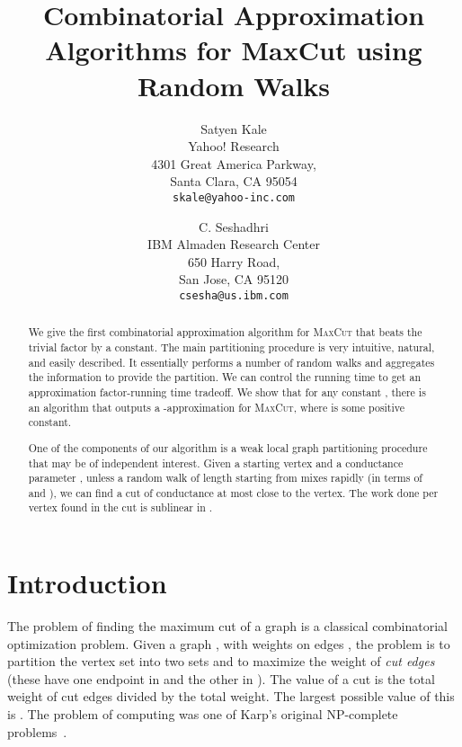 \documentclass[11pt]{article}
\def\maxcut{\textsc{MaxCut}\xspace}
\begin{document}
\begin{titlepage}
\title{Combinatorial Approximation Algorithms for {\sc MaxCut} using Random Walks}
\date{}
\author{
Satyen Kale\\
Yahoo! Research\\
4301 Great America Parkway, \\
Santa Clara, CA 95054\\
{\tt skale@yahoo-inc.com} \and
C. Seshadhri \\
IBM Almaden Research Center\\
650 Harry Road, \\
San Jose, CA 95120\\
{\tt csesha@us.ibm.com}}
\maketitle

\thispagestyle{empty}
\begin{abstract}

We give the first combinatorial approximation algorithm for \maxcut that beats
the trivial  factor by a constant. The main partitioning procedure is very intuitive, natural, and easily described. It essentially performs a number of random walks and aggregates the information to provide the partition. We can control the running time to get an approximation factor-running time tradeoff. We show that for any constant , there is an  algorithm that outputs a -approximation for \maxcut, where  is some positive constant.

One of the components of our algorithm is a weak local
graph partitioning procedure that may be of independent interest. Given a starting vertex  and a conductance parameter , unless a random walk of length  starting from  mixes rapidly (in terms of  and ), we can find a cut of conductance at most  close to the vertex. The work done per vertex found in the cut is sublinear in .
\end{abstract}
\end{titlepage}


\section{Introduction}

The problem of finding the maximum cut of a graph is a classical combinatorial optimization problem. Given a graph , with weights  on edges , the problem is to partition the vertex set  into two sets  and  to maximize the weight of \emph{cut edges} (these have one endpoint in  and the other in ). The value of a cut is the total weight of cut edges divided by the total weight. The largest possible value of this is .
The problem of computing  was one of Karp's original NP-complete problems~\cite{Kar75}.
\end{document}
